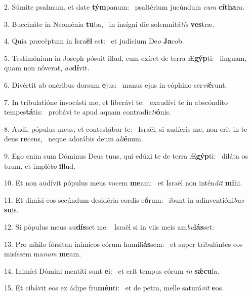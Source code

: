 2. Súmite psalmum, et date \textbf{tým}panum: \ast\  psaltérium jucúndum \textit{cum} \textbf{cí}\textbf{tha}ra.\

3. Buccináte in Neoménia \textbf{tu}ba, \ast\  in insígni die solemnitá\textit{tis} \textbf{ves}træ.\

4. Quia præcéptum in Isra\textbf{ël} est: \ast\  et judícium De\textit{o} \textbf{Ja}cob.\

5. Testimónium in Joseph pósuit illud, cum exíret de terra Æ\textbf{gýp}ti: \ast\  linguam, quam non nóverat, \textit{au}\textbf{dí}vit.\

6. Divértit ab onéribus dorsum \textbf{e}jus: \ast\  manus ejus in cóphino ser\textit{vi}\textbf{é}runt.\

7. In tribulatióne invocásti me, et liberávi te: \dag\  exaudívi te in abscóndito tempes\textbf{tá}tis: \ast\  probávi te apud aquam contradic\textit{ti}\textbf{ó}nis.\

8. Audi, pópulus meus, et contestábor te: \dag\  Israël, si audíeris me, non erit in te deus \textbf{re}cens, \ast\  neque adorábis deum a\textit{li}\textbf{é}num.\

9. Ego enim sum Dóminus Deus tuus, qui edúxi te de terra Æ\textbf{gýp}ti: \ast\  diláta os tuum, et implé\textit{bo} \textbf{il}lud.\

10. Et non audívit pópulus meus vocem \textbf{me}am: \ast\  et Israël non intén\textit{dit} \textbf{mi}hi.\

11. Et dimísi eos secúndum desidéria cordis e\textbf{ó}rum: \ast\  ibunt in adinventióni\textit{bus} \textbf{su}is.\

12. Si pópulus meus au\textbf{dís}set me: \ast\  Israël si in viis meis am\textit{bu}\textbf{lás}set:\

13. Pro níhilo fórsitan inimícos eórum humili\textbf{ás}sem: \ast\  et super tribulántes eos misíssem ma\textit{num} \textbf{me}am.\

14. Inimíci Dómini mentíti sunt \textbf{e}i: \ast\  et erit tempus eórum \textit{in} \textbf{sǽ}\textbf{cu}la.\

15. Et cibávit eos ex ádipe fru\textbf{mén}ti: \ast\  et de petra, melle saturá\textit{vit} \textbf{e}os.\

